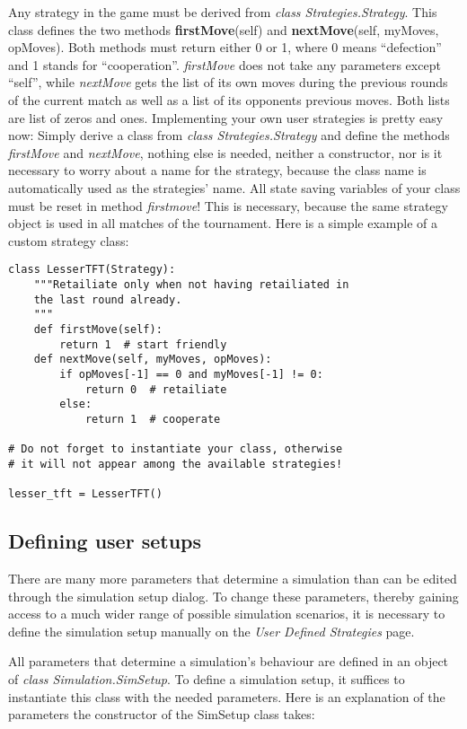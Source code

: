 \documentclass[12pt,a4paper,USenglish]{article}
\begin{document}
Any strategy in the game must be derived from \emph{class Strategies.Strategy}.
This class defines the two methods \textbf{firstMove}(self) and
\textbf{nextMove}(self, myMoves, opMoves). Both methods must return
either 0 or 1, where 0 means ``defection'' and 1 stands for
``cooperation''. \emph{firstMove} does not take any parameters except
``self'', while \emph{nextMove} gets the list of its own moves
during the previous rounds of the current match as well as a list
of its opponents previous moves. Both lists are list of zeros and
ones. Implementing your own user strategies is pretty easy now: Simply
derive a class from \emph{class Strategies.Strategy} and define the
methods \emph{firstMove} and \emph{nextMove}, nothing else is needed,
neither a constructor, nor is it necessary to worry about a name for
the strategy, because the class name is automatically used as the
strategies' name. All state saving variables of your class 
must be reset in  method {\em firstmove}! This is necessary, because
the same strategy object is used in all matches of the tournament.
Here is a simple example of a custom strategy class:

\begin{verbatim}
class LesserTFT(Strategy):    
    """Retailiate only when not having retailiated in    
    the last round already.    
    """
    def firstMove(self):
        return 1  # start friendly
    def nextMove(self, myMoves, opMoves):
        if opMoves[-1] == 0 and myMoves[-1] != 0:
            return 0  # retailiate
        else: 
            return 1  # cooperate

# Do not forget to instantiate your class, otherwise
# it will not appear among the available strategies!

lesser_tft = LesserTFT()
\end{verbatim}


\subsection{Defining user setups}

There are many more parameters that determine a simulation than can be
edited through the simulation setup dialog. To change these
parameters, thereby gaining access to a much wider range of possible
simulation scenarios, it is necessary to define the simulation setup
manually on the {\em User Defined Strategies} page. 

All parameters that determine a simulation's behaviour are defined in
an object of \emph{class Simulation.SimSetup}. To define a simulation
setup, it suffices to instantiate this class with the needed
parameters. Here is an explanation of the parameters the constructor
of the SimSetup class takes:
\end{document}
